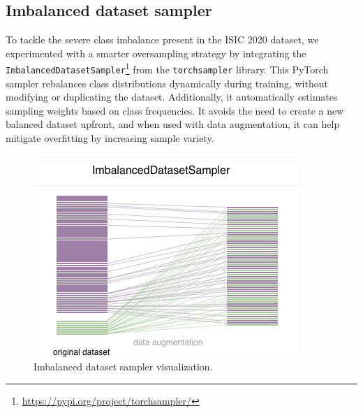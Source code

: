 \subsection{Imbalanced dataset sampler}

To tackle the severe class imbalance present in the ISIC 2020 dataset, we experimented with a smarter oversampling strategy by integrating the \texttt{ImbalancedDatasetSampler}\footnote{\url{https://pypi.org/project/torchsampler/}} from the \texttt{torchsampler} library. This PyTorch sampler rebalances class distributions dynamically during training, without modifying or duplicating the dataset. Additionally, it automatically estimates sampling weights based on class frequencies. It avoids the need to create a new balanced dataset upfront, and when used with data augmentation, it can help mitigate overfitting by increasing sample variety.


\vspace{1em}
\begin{figure}[htbp]
\centering
\includegraphics[width=0.5\linewidth]{figures/imbalanced_dataset_sampler.png}
\caption{Imbalanced dataset sampler visualization.}
\label{fig:imbalanced_dataset_sampler}
\end{figure}
